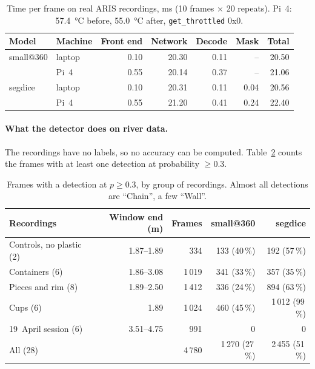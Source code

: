 \documentclass[11pt,a4paper]{article}
\begin{document}
\begin{table}[H]
\centering
\caption{Time per frame on real ARIS recordings, ms (10 frames $\times$ 20
repeats). Pi~4: \SI{57.4}{\celsius} before, \SI{55.0}{\celsius} after,
\texttt{get\_throttled} 0x0.}
\label{tab:danstime}
\begin{tabular}{llrrrrr}
\toprule
Model & Machine & Front end & Network & Decode & Mask & Total \\
\midrule
small@360 & laptop & 0.10 & 20.30 & 0.11 & -- & 20.50 \\
          & Pi~4   & 0.55 & 20.14 & 0.37 & -- & 21.06 \\
segdice   & laptop & 0.10 & 20.31 & 0.11 & 0.04 & 20.56 \\
          & Pi~4   & 0.55 & 21.20 & 0.41 & 0.24 & 22.40 \\
\bottomrule
\end{tabular}
\end{table}

\paragraph{What the detector does on river data.} The recordings have no
labels, so no accuracy can be computed. Table~\ref{tab:danshits} counts
the frames with at least one detection at probability $\ge 0.3$.

\begin{table}[H]
\centering
\caption{Frames with a detection at $p \ge 0.3$, by group of recordings.
Almost all detections are ``Chain'', a few ``Wall''.}
\label{tab:danshits}
\begin{tabular}{lrrrr}
\toprule
Recordings & Window end (m) & Frames & small@360 & segdice \\
\midrule
Controls, no plastic (2)        & 1.87--1.89 & 334   & 133 (40\,\%) & 192 (57\,\%) \\
Containers (6)                  & 1.86--3.08 & 1\,019 & 341 (33\,\%) & 357 (35\,\%) \\
Pieces and rim (8)              & 1.89--2.50 & 1\,412 & 336 (24\,\%) & 894 (63\,\%) \\
Cups (6)                        & 1.89       & 1\,024 & 460 (45\,\%) & 1\,012 (99\,\%) \\
19~April session (6)            & 3.51--4.75 & 991   & 0            & 0 \\
\midrule
All (28)                        &            & 4\,780 & 1\,270 (27\,\%) & 2\,455 (51\,\%) \\
\bottomrule
\end{tabular}
\end{table}
\end{document}
